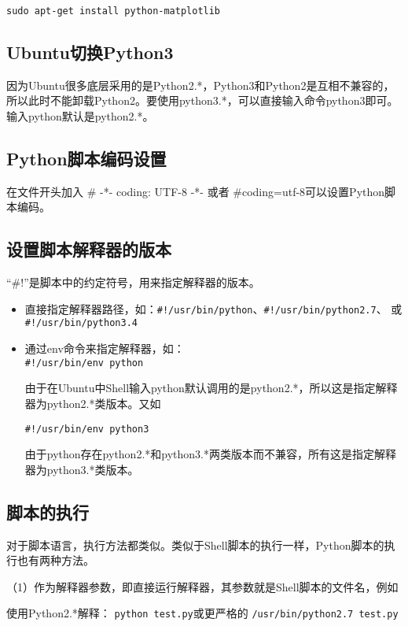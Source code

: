 \verb|sudo apt-get install python-matplotlib|



\subsection{Ubuntu切换Python3}
因为Ubuntu很多底层采用的是Python2.*，Python3和Python2是互相不兼容的，所以此时不能卸载Python2。要使用python3.*，可以直接输入命令python3即可。输入python默认是python2.*。



\subsection{Python脚本编码设置}
在文件开头加入 \# -*- coding: UTF-8 -*- 或者 \#coding=utf-8可以设置Python脚本编码。


\subsection{设置脚本解释器的版本}
``\#!''是脚本中的约定符号，用来指定解释器的版本。
\begin{itemize}
\item 直接指定解释器路径，如：\verb|#!/usr/bin/python|、\verb|#!/usr/bin/python2.7|、
或\verb|#!/usr/bin/python3.4|

\item 通过env命令来指定解释器，如：\\

\verb|#!/usr/bin/env python|

由于在Ubuntu中Shell输入python默认调用的是python2.*，所以这是指定解释器为python2.*类版本。又如

\verb|#!/usr/bin/env python3|

由于python存在python2.*和python3.*两类版本而不兼容，所有这是指定解释器为python3.*类版本。
\end{itemize}



\subsection{脚本的执行}
对于脚本语言，执行方法都类似。类似于Shell脚本的执行一样，Python脚本的执行也有两种方法。

（1）作为解释器参数，即直接运行解释器，其参数就是Shell脚本的文件名，例如

使用Python2.*解释：
\verb|python test.py|\qquad 或更严格的 \qquad \verb|/usr/bin/python2.7 test.py|

